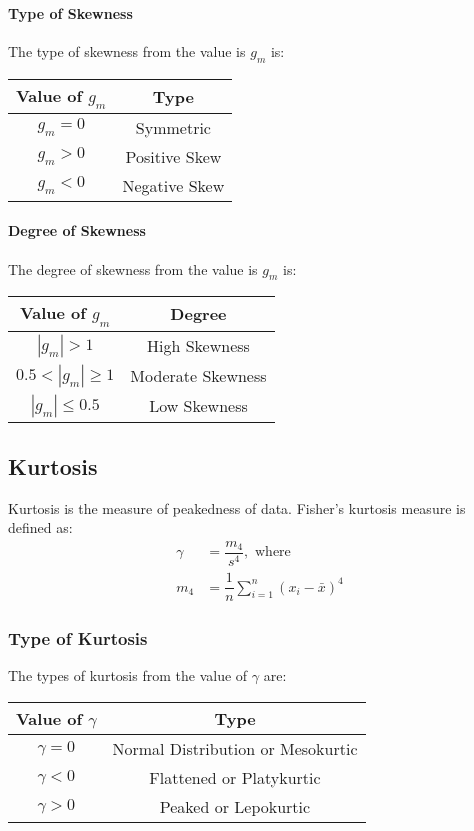 \documentclass[openany,b5paper]{article}
\begin{document}
\paragraph{Type of Skewness}
The type of skewness from the value is $g_m$ is:
\begin{table}[h!]
\centering
\begin{tabular}{c|c}
Value of $g_m$ & Type\\
\hline
$g_m = 0$ & Symmetric\\
$g_m > 0$ & Positive Skew\\
$g_m < 0$ & Negative Skew
\end{tabular}
\end{table}

\paragraph{Degree of Skewness}
The degree of skewness from the value is $g_m$ is:
\begin{table}[h!]
\centering
\begin{tabular}{c|c}
Value of $g_m$ & Degree\\
\hline
$|g_m| > 1$ & High Skewness\\
$0.5 <|g_m| \geq 1$ & Moderate Skewness\\
$|g_m| \leq 0.5$ & Low Skewness
\end{tabular}
\end{table}

\subsection{Kurtosis}
Kurtosis is the measure of peakedness of data. Fisher's kurtosis measure is defined as:
\begin{align}
\gamma &= \dfrac{m_4}{s^4}, \text{ where}\\
m_4 &= \dfrac{1}{n}\sum_{i=1}^{n} \left( x_i - \bar{x} \right)^4
\end{align}

\subsubsection{Type of Kurtosis}
The types of kurtosis from the value of $\gamma$ are:
\begin{table}[h!]
\centering
\begin{tabular}{c|c}
Value of $\gamma$ & Type\\
\hline
$\gamma = 0$ & Normal Distribution or Mesokurtic\\
$\gamma < 0$ & Flattened or Platykurtic\\
$\gamma > 0$ & Peaked or Lepokurtic
\end{tabular}
\end{table}
\end{document}
